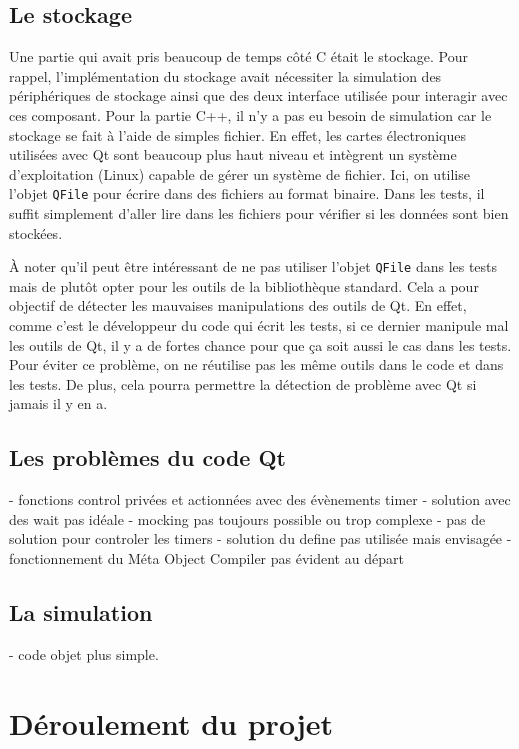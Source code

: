 \documentclass[a4paper]{article}
\begin{document}
\subsection{Le stockage}

Une partie qui avait pris beaucoup de temps côté C était le stockage. Pour
rappel, l'implémentation du stockage avait nécessiter la simulation des
périphériques de stockage ainsi que des deux interface utilisée pour interagir
avec ces composant. Pour la partie C++, il n'y a pas eu besoin de simulation car
le stockage se fait à l'aide de simples fichier. En effet, les cartes
électroniques utilisées avec Qt sont beaucoup plus haut niveau et intègrent un
système d'exploitation (Linux) capable de gérer un système de fichier. Ici, on
utilise l'objet \verb|QFile| pour écrire dans des fichiers au format binaire.
Dans les tests, il suffit simplement d'aller lire dans les fichiers pour
vérifier si les données sont bien stockées.

À noter qu'il peut être intéressant de ne pas utiliser l'objet \verb|QFile|
dans les tests mais de plutôt opter pour les outils de la bibliothèque
standard. Cela a pour objectif de détecter les mauvaises manipulations des
outils de Qt. En effet, comme c'est le développeur du code qui écrit les tests,
si ce dernier manipule mal les outils de Qt, il y a de fortes chance pour que ça
soit aussi le cas dans les tests. Pour éviter ce problème, on ne réutilise pas
les même outils dans le code et dans les tests. De plus, cela pourra permettre
la détection de problème avec Qt si jamais il y en a.

\subsection{Les problèmes du code Qt}

- fonctions control privées et actionnées avec des évènements timer
- solution avec des wait pas idéale
- mocking pas toujours possible ou trop complexe
- pas de solution pour controler les timers
- solution du define pas utilisée mais envisagée
- fonctionnement du Méta Object Compiler pas évident au départ

\subsection{La simulation}

- code objet plus simple.
\section{Déroulement du projet}%
\end{document}
